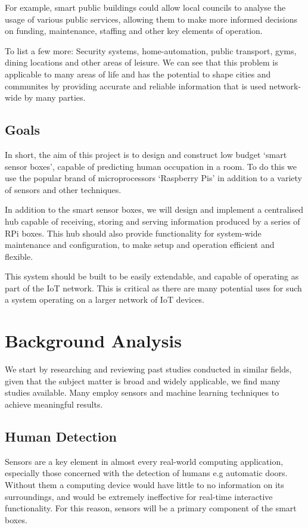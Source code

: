 \documentclass{l4proj}
\begin{document}
For example, smart public buildings could allow local councils to analyse the usage of various public services, allowing them to make more informed decisions on funding, maintenance, staffing and other key elements of operation.

To list a few more: Security systems, home-automation, public transport, gyms, dining locations and other areas of leisure. We can see that this problem is applicable to many areas of life and has the potential to shape cities and communites by providing accurate and reliable information that is used network-wide by many parties.


\section{Goals}
In short, the aim of this project is to design and construct low budget ‘smart sensor boxes’, capable of predicting human occupation in a room. To do this we use the popular brand of microprocessors ‘Raspberry Pis’ in addition to a variety of sensors and other techniques.

In addition to the smart sensor boxes, we will design and implement a centralised hub capable of receiving, storing and serving information produced by a series of RPi boxes. This hub should also provide functionality for system-wide maintenance and configuration, to make setup and operation efficient and flexible.

This system should be built to be easily extendable, and capable of operating as part of the IoT network. This is critical as there are many potential uses for such a system operating on a larger network of IoT devices. 


\chapter{Background Analysis}
We start by researching and reviewing past studies conducted in similar fields, given that the subject matter is broad and widely applicable, we find many studies available. Many employ sensors and machine learning techniques to achieve meaningful results.


\section{Human Detection}
Sensors are a key element in almost every real-world computing application, especially those concerned with the detection of humans e.g automatic doors. Without them a computing device would have little to no information on its surroundings, and would be extremely ineffective for real-time interactive functionality. For this reason, sensors will be a primary component of the smart boxes.
\end{document}
